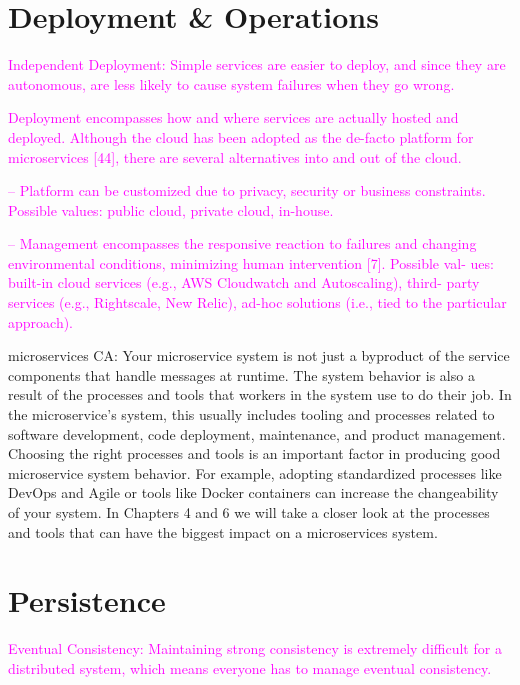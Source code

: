 \documentclass[thesis=M,english,hidelinks]{FITthesis}[2012/10/20]
\begin{document}
\section{Deployment \& Operations}
\textcolor{magenta}{Independent Deployment: Simple services are easier to deploy, and since they are autonomous, are less likely to cause system failures when they go wrong.}

\textcolor{magenta}{Deployment encompasses how and where services are actually hosted and deployed. Although the cloud has been adopted as the de-facto platform for microservices [44], there are several alternatives into and out of the cloud.}

\textcolor{magenta}{– Platform can be customized due to privacy, security or business constraints. Possible values: public cloud, private cloud, in-house.}

\textcolor{magenta}{– Management encompasses the responsive reaction to failures and changing environmental conditions, minimizing human intervention [7]. Possible val- ues: built-in cloud services (e.g., AWS Cloudwatch and Autoscaling), third- party services (e.g., Rightscale, New Relic), ad-hoc solutions (i.e., tied to the particular approach).}


microservices CA:
Your microservice system is not just a byproduct of the service components that handle messages at runtime. The system behavior is also a result of the processes and tools that workers in the system use to do their job. In the microservice’s system, this usually includes tooling and processes related to software development, code deployment, maintenance, and product management.
Choosing the right processes and tools is an important factor in producing good microservice system behavior. For example, adopting standardized processes like DevOps and Agile or tools like Docker containers can increase the changeability of your system. In Chapters 4 and 6 we will take a closer look at the processes and tools that can have the biggest impact on a microservices system.

% 
% 
\section{Persistence}




\textcolor{magenta}{Eventual Consistency: Maintaining strong consistency is extremely difficult for a distributed system, which means everyone has to manage eventual consistency.}
\end{document}
